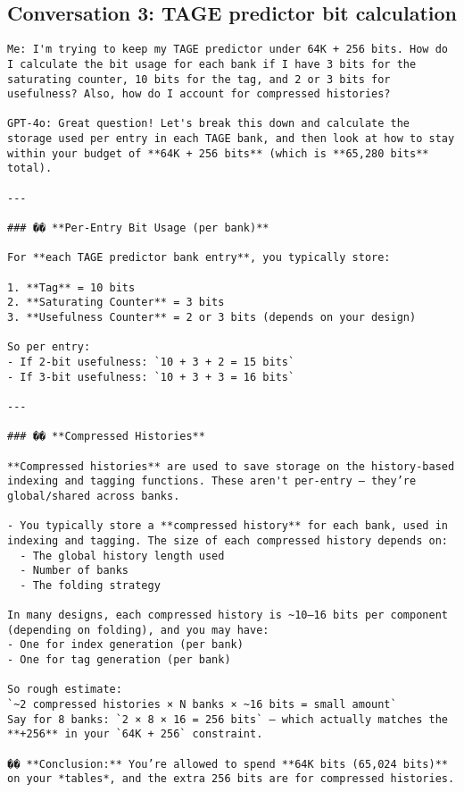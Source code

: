 \documentclass[11pt]{article}
\begin{document}
\subsection{Conversation 3: TAGE predictor bit calculation}
\begin{Verbatim}[fontsize=\tiny, breaklines=true]
Me: I'm trying to keep my TAGE predictor under 64K + 256 bits. How do I calculate the bit usage for each bank if I have 3 bits for the saturating counter, 10 bits for the tag, and 2 or 3 bits for usefulness? Also, how do I account for compressed histories?

GPT-4o: Great question! Let's break this down and calculate the storage used per entry in each TAGE bank, and then look at how to stay within your budget of **64K + 256 bits** (which is **65,280 bits** total).

---

### �� **Per-Entry Bit Usage (per bank)**

For **each TAGE predictor bank entry**, you typically store:

1. **Tag** = 10 bits
2. **Saturating Counter** = 3 bits
3. **Usefulness Counter** = 2 or 3 bits (depends on your design)

So per entry:
- If 2-bit usefulness: `10 + 3 + 2 = 15 bits`
- If 3-bit usefulness: `10 + 3 + 3 = 16 bits`

---

### �� **Compressed Histories**

**Compressed histories** are used to save storage on the history-based indexing and tagging functions. These aren't per-entry — they’re global/shared across banks.

- You typically store a **compressed history** for each bank, used in indexing and tagging. The size of each compressed history depends on:
  - The global history length used
  - Number of banks
  - The folding strategy

In many designs, each compressed history is ~10–16 bits per component (depending on folding), and you may have:
- One for index generation (per bank)
- One for tag generation (per bank)

So rough estimate:
`~2 compressed histories × N banks × ~16 bits = small amount`
Say for 8 banks: `2 × 8 × 16 = 256 bits` — which actually matches the **+256** in your `64K + 256` constraint.

�� **Conclusion:** You’re allowed to spend **64K bits (65,024 bits)** on your *tables*, and the extra 256 bits are for compressed histories.


\end{Verbatim}
\end{document}
